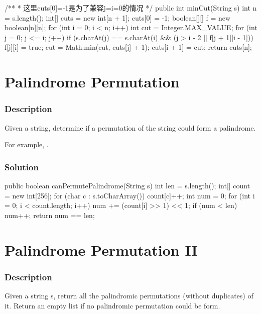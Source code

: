 \begin{Code}
/**
 * 这里cuts[0]=-1是为了兼容j=i=0的情况
 */
public int minCut(String s) {
    int n = s.length();
    int[] cuts = new int[n + 1];
    cuts[0] = -1;
    boolean[][] f = new boolean[n][n];
    for (int i = 0; i < n; i++) {
        int cut = Integer.MAX_VALUE;
        for (int j = 0; j <= i; j++) {
            if (s.charAt(j) == s.charAt(i) && (j > i - 2 || f[j + 1][i - 1])) {
                f[j][i] = true;
                cut = Math.min(cut, cuts[j] + 1);
            }
        }
        cuts[i + 1] = cut;
    }
    return cuts[n];
}
\end{Code}

\newpage

\section{Palindrome Permutation} %

\subsubsection{Description}

Given a string, determine if a permutation of the string could form a palindrome.

For example, .

\subsubsection{Solution}

\begin{Code}
public boolean canPermutePalindrome(String s) {
    int len = s.length();
    int[] count = new int[256];
    for (char c : s.toCharArray()) {
        count[c]++;
    }
    int num = 0;
    for (int i = 0; i < count.length; i++) {
        num += (count[i] >> 1) << 1;
    }
    if (num < len) {
        num++;
    }
    return num == len;
}
\end{Code}

\newpage

\section{Palindrome Permutation II} %

\subsubsection{Description}
Given a string s, return all the palindromic permutations (without duplicates) of it. Return an empty list if no palindromic permutation could be form.


